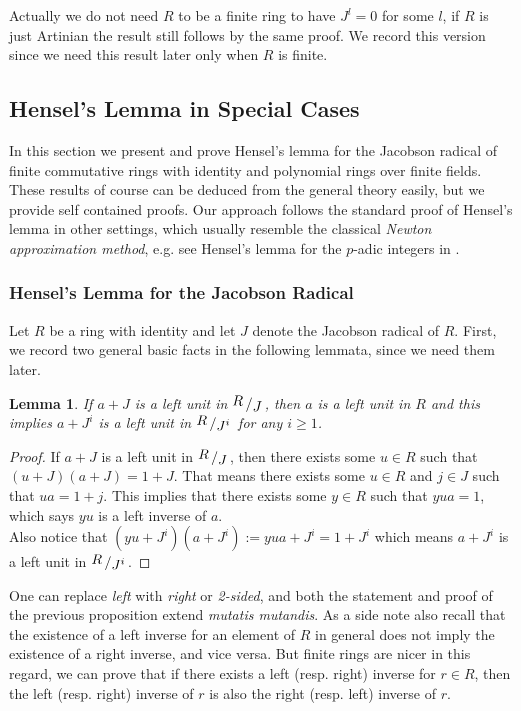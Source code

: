 \documentclass[11pt,reqno]{amsart}
\newtheorem{lem}[thm]{Lemma}
\newcommand{\bigslant}[2]{{\raisebox{.2em}{$#1$}\left/\raisebox{-.2em}{$#2$}\right.}}
\begin{document}
Actually we do not need $R$ to be a finite ring to have $J^l=0$ for some $l$, if $R$ is just Artinian the result still follows by the same proof. We record this version since we need this result later only when $R$ is finite.

\subsection{Hensel's Lemma in Special Cases}
In this section we present and prove Hensel's lemma for the Jacobson radical of finite commutative rings with identity and polynomial rings over finite fields. These results of course can be deduced from the general theory easily, but we provide self contained proofs. Our approach follows the standard proof of Hensel's lemma in other settings, which usually resemble the classical \emph{Newton approximation method}, e.g. see Hensel's lemma for the $p$-adic integers in \cite{Alain}.

\subsubsection{Hensel's Lemma for the Jacobson Radical} 
Let $R$ be a ring with identity and let $J$ denote the Jacobson radical of $R$. First, we record two general basic facts in the following lemmata, since we need them later. 

\begin{lem} \label{Small Fact} 
If $a+J$ is a left unit in $\bigslant{R}{J}$, then $a$ is a left unit in $R$ and this implies $a+J^i$ is a left unit in $\bigslant{R}{J^i}$ for any $i \geqslant 1$.
\end{lem}

\begin{proof} 
If $a+J$ is a left unit in $\bigslant{R}{J}$, then there exists some $u \in R$ such that $(u+J)(a+J)=1+J$. That means there exists some $u \in R$ and $j \in J$ such that $ua=1+j$. This implies that there exists some $y \in R$ such that $yua=1$, which says $yu$ is a left inverse of $a$.\\
Also notice that $(yu+J^i)(a+J^i):=yua+J^i=1+J^i$ which means $a+J^i$ is a left unit in $\bigslant{R}{J^i}$.
\end{proof}

One can replace \emph{left} with \emph{right} or \emph{2-sided}, and both the statement and proof of the previous proposition extend \emph{mutatis mutandis}. As a side note also recall that the existence of a left inverse for an element of $R$ in general does not imply the existence of a right inverse, and vice versa. But finite rings are nicer in this regard, we can prove that if there exists a left (resp. right) inverse for $r \in R$, then the left (resp. right) inverse of $r$ is also the right (resp. left) inverse of $r$.
\end{document}
